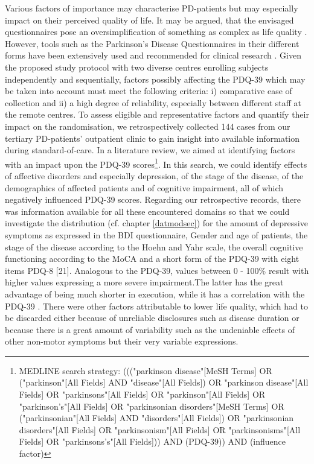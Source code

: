 \documentclass[number,12pt,review]{elsarticle}
\begin{document}
Various factors of importance may characterise \ac{PD}-patients but may especially impact on their perceived quality of life. It may be argued, that the envisaged questionnaires pose an oversimplification of something as complex as life quality \citep{martinez1998introduction}. However, tools such as the Parkinson's Disease Questionnaires in their different forms have been extensively used and recommended for clinical research \citep{marinus2002health}. Given the proposed study protocol with two diverse centres enrolling subjects independently and sequentially, factors possibly affecting the \ac{PDQ-39} which may be taken into account must meet the following criteria: i) comparative ease of collection and ii) a high degree of reliability, especially between different staff at the remote centres. To assess eligible and representative factors and quantify their impact on the randomisation, we retrospectively collected 144 cases from our tertiary \ac{PD}-patients' outpatient clinic to gain insight into available information during standard-of-care. In a literature review, we aimed at identifying factors with an impact upon the \ac{PDQ-39} scores\footnote{MEDLINE search strategy: ((("parkinson disease"[MeSH Terms] OR ("parkinson"[All Fields] AND "disease"[All Fields]) OR "parkinson disease"[All Fields] OR "parkinsons"[All Fields] OR "parkinson"[All Fields] OR "parkinson's"[All Fields] OR "parkinsonian disorders"[MeSH Terms] OR ("parkinsonian"[All Fields] AND "disorders"[All Fields]) OR "parkinsonian disorders"[All Fields] OR "parkinsonism"[All Fields] OR "parkinsonisms"[All Fields] OR "parkinsons's"[All Fields])) AND (PDQ-39)) AND (influence factor)}. In this search, we could identify effects of affective disorders and especially depression\citep{Rosinczuk2017-rn, Wiesli2017-eq}, of the stage of the disease, of the demographics of affected patients \citep{Wu2014-pk} and of cognitive impairment, all of which negatively influenced \ac{PDQ-39} scores. Regarding our retrospective records, there was information available for all these encountered domains so that we could investigate the distribution (cf. chapter \ref{datmodsec}) for the amount of depressive symptoms as expressed in the \ac{BDI} questionnaire, Gender and age of patients, the stage of the disease according to the Hoehn and Yahr scale, the overall cognitive functioning according to the \ac{MoCA}\citep{nasreddine2005montreal} and a short form of the \ac{PDQ-39} with eight items \acs{PDQ-8} [21]. Analogous to the \ac{PDQ-39}, values between 0 - 100\% result with higher values expressing a more severe impairment.The latter has the great advantage of being much shorter in execution, while it has a correlation with the PDQ-39 \citep{chen2017evaluation}. There were other factors attributable to lower life quality, which had to be discarded either because of unreliable disclosures such as disease duration \citep{Benge2016-wp} or because there is a great amount of variability such as the undeniable effects of other non-motor symptoms \citep{Wu2014-pk, Zipprich2021-vv} but their very variable expressions.
\end{document}
